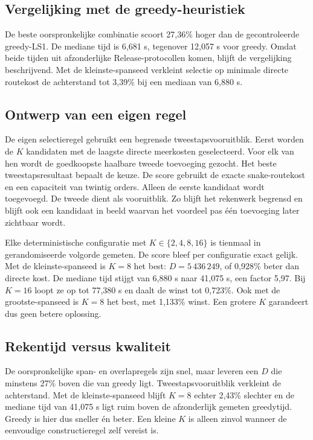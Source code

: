 \documentclass[a4paper,11pt]{article}
\newcommand{\dist}{\ensuremath{D}}
\begin{document}
\subsection{Vergelijking met de greedy-heuristiek}
De beste oorspronkelijke combinatie scoort 27,36\% hoger dan de gecontroleerde
greedy-LS1. De mediane tijd is 6,681 s, tegenover 12,057 s voor greedy. Omdat
beide tijden uit afzonderlijke Release-protocollen komen, blijft de vergelijking
beschrijvend. Met de kleinste-spanseed verkleint selectie op minimale directe routekost de
achterstand tot 3,39\% bij een mediaan van 6,880 s.

\subsection{Ontwerp van een eigen regel}
De eigen selectieregel gebruikt een begrensde tweestapsvooruitblik. Eerst worden
de $K$ kandidaten met de laagste directe meerkosten geselecteerd. Voor elk van
hen wordt de goedkoopste haalbare tweede toevoeging gezocht. Het beste
tweestapsresultaat bepaalt de keuze. De score gebruikt de exacte snake-routekost
en een capaciteit van twintig orders. Alleen de eerste kandidaat wordt
toegevoegd. De tweede dient als vooruitblik. Zo blijft het rekenwerk begrensd en
blijft ook een kandidaat in beeld waarvan het voordeel pas één toevoeging later
zichtbaar wordt.

Elke deterministische configuratie met $K\in\{2,4,8,16\}$ is tienmaal in
gerandomiseerde volgorde gemeten. De score bleef per configuratie exact gelijk.
Met de kleinste-spanseed is $K=8$ het best: $D=5\,436\,249$, of 0,928\% beter
dan directe kost. De mediane tijd stijgt van 6,880 s naar 41,075 s, een factor
5,97. Bij $K=16$ loopt ze op tot 77,380 s en daalt de winst tot 0,723\%. Ook met
de grootste-spanseed is $K=8$ het best, met 1,133\% winst. Een grotere $K$
garandeert dus geen betere oplossing.

\subsection{Rekentijd versus kwaliteit}
De oorspronkelijke span- en overlapregels zijn snel, maar leveren een \dist{}
die minstens 27\% boven die van greedy ligt. Tweestapsvooruitblik verkleint de achterstand. Met de
kleinste-spanseed blijft $K=8$ echter 2,43\% slechter en de mediane tijd van 41,075 s ligt
ruim boven de afzonderlijk gemeten greedytijd. Greedy is hier dus sneller én
beter. Een kleine $K$ is alleen zinvol wanneer de eenvoudige constructieregel
zelf vereist is.
\end{document}
